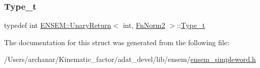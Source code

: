 \subsubsection{\texorpdfstring{Type\_t}{Type\_t}\hspace{0.1cm}{\footnotesize\ttfamily [2/2]}}
{\footnotesize\ttfamily typedef int \mbox{\hyperlink{structENSEM_1_1UnaryReturn}{E\+N\+S\+E\+M\+::\+Unary\+Return}}$<$ int, \mbox{\hyperlink{structENSEM_1_1FnNorm2}{Fn\+Norm2}} $>$\+::\mbox{\hyperlink{structENSEM_1_1UnaryReturn_3_01int_00_01FnNorm2_01_4_ae4204ae93a1e761995e0aaab5504ea66}{Type\+\_\+t}}}



The documentation for this struct was generated from the following file\+:\begin{DoxyCompactItemize}
\item 
/\+Users/archanar/\+Kinematic\+\_\+factor/adat\+\_\+devel/lib/ensem/\mbox{\hyperlink{lib_2ensem_2ensem__simpleword_8h}{ensem\+\_\+simpleword.\+h}}\end{DoxyCompactItemize}
